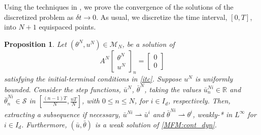 \documentclass[12pt]{amsart}
\newcommand{\Rr}{{\mathbb{R}}}
\newcommand{\1}{{\chi}}
\newcommand{\Mm}{{\mathcal{M}}}
\newcommand{\Ss}{\mathcal{S}}
\newtheorem{pro}{Proposition}
\theoremstyle{definition}
\begin{document}
	 Using the techniques in \cite{AFG}, we prove the convergence of  the solutions of the discretized problem as $\delta t \to 0$. As usual, we discretize the time interval, $[0,T]$, into $N+1$ equispaced points. 
	 \begin{pro}
		 Let $(\theta^N, u^N)\in \Mm_N$, be a solution of 
		 \begin{equation*}
			 A^N\left[
			 \begin{array}{c}
				 \theta^N\\
				 u^N
			 \end{array}
			 \right]_n 
			 = 
			 \left[
			 \begin{array}{c}
				 0\\
                 0
             \end{array}
			 \right]
		\end{equation*}
		satisfying the initial-terminal conditions in \eqref{itc}.
		Suppose $u^N$ is uniformly bounded. Consider the step functions, $\bar u^N$, $\bar \theta^N$, taking the values $\bar u^{N i}_n \in \Rr$ and $\bar{\theta}_n^{N i} \in \Ss$ in $[\frac{(n-1)T}{N},\frac{n T}{N}]$, 
		with $0\leq n \leq N$, for $i\in I_d$, respectively.
		Then, extracting a subsequence if necessary,  $\bar u^{N i} \rightharpoonup \bar u^i$ and $\bar \theta^{N i} \rightharpoonup \theta^i$, weakly-* in $L^\infty$ for $i \in I_d$. 
		Furthermore, $(\bar u, \bar \theta)$ is a weak solution of \eqref{MFM:cont_dyn}.
    \end{pro}
\end{document}
